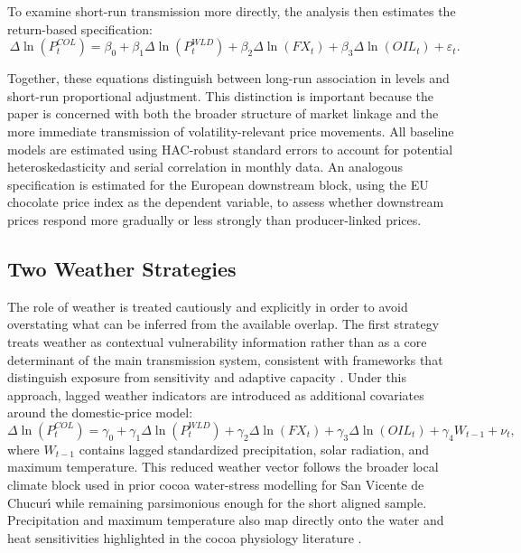 \documentclass[11pt]{article}
\begin{document}
To examine short-run transmission more directly, the analysis then estimates the return-based specification:
\begin{equation}
\Delta \ln(P^{COL}_{t}) = \beta_0 + \beta_1 \Delta \ln(P^{WLD}_{t}) + \beta_2 \Delta \ln(FX_t) + \beta_3 \Delta \ln(OIL_t) + \varepsilon_t.
\label{eq:core_returns}
\end{equation}

Together, these equations distinguish between long-run association in levels and short-run proportional adjustment. This distinction is important because the paper is concerned with both the broader structure of market linkage and the more immediate transmission of volatility-relevant price movements. All baseline models are estimated using HAC-robust standard errors to account for potential heteroskedasticity and serial correlation in monthly data. An analogous specification is estimated for the European downstream block, using the EU chocolate price index as the dependent variable, to assess whether downstream prices respond more gradually or less strongly than producer-linked prices.

\subsection{Two Weather Strategies}

The role of weather is treated cautiously and explicitly in order to avoid overstating what can be inferred from the available overlap. The first strategy treats weather as contextual vulnerability information rather than as a core determinant of the main transmission system, consistent with frameworks that distinguish exposure from sensitivity and adaptive capacity \citep{Turner2003,Adger2006}. Under this approach, lagged weather indicators are introduced as additional covariates around the domestic-price model:
\begin{equation}
\Delta \ln(P^{COL}_{t}) = \gamma_0 + \gamma_1 \Delta \ln(P^{WLD}_{t}) + \gamma_2 \Delta \ln(FX_t) + \gamma_3 \Delta \ln(OIL_t) + \gamma_4 W_{t-1} + \nu_t,
\label{eq:weather_context}
\end{equation}
where $W_{t-1}$ contains lagged standardized precipitation, solar radiation, and maximum temperature. This reduced weather vector follows the broader local climate block used in prior cocoa water-stress modelling for San Vicente de Chucur\'{\i} \citep{talero_sarmiento_etal_2025} while remaining parsimonious enough for the short aligned sample. Precipitation and maximum temperature also map directly onto the water and heat sensitivities highlighted in the cocoa physiology literature \citep{Lahive2019}. %
\end{document}
